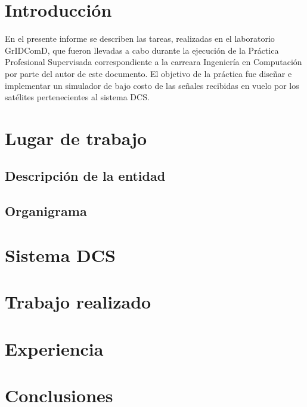 \documentclass[a4paper,12pt]{article}
\begin{document}
\tableofcontents

\pagebreak

\section{Introducción}
En el presente informe se describen las tareas, realizadas en el laboratorio
GrIDComD, que fueron llevadas a cabo durante la ejecución de la Práctica Profesional
Supervisada correspondiente a la carreara Ingeniería en Computación por parte del autor de
este documento. El objetivo de la práctica fue diseñar e implementar un simulador de bajo costo
de las señales recibidas en vuelo por los satélites pertenecientes al sistema DCS.

\section{Lugar de trabajo}
\subsection{Descripción de la entidad}
\subsection{Organigrama}
\section{Sistema DCS}
\section{Trabajo realizado}
\section{Experiencia}
\section{Conclusiones}
\end{document}
